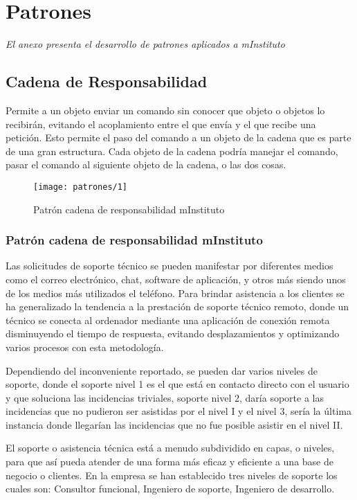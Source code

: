 \chapter{Patrones}
\label{apex:patrones}
\textit{El anexo presenta el desarrollo de patrones aplicados a mInstituto}
\vfill
\minitoc
\cleardoublepage

\section{Cadena de Responsabilidad}
Permite a un objeto enviar un comando sin conocer que objeto o objetos lo recibirán, evitando el acoplamiento entre el que envía y el que recibe una petición. Esto permite el paso del comando a un objeto de la cadena que es parte de una gran estructura. Cada objeto de la cadena podría manejar el comando, pasar el comando al siguiente objeto de la cadena, o las dos cosas. \cite{ref12}

  \begin{figure}[H]
 	\centering
  	\texttt{[image: patrones/1]}
  	\captionsetup{width=.95\textwidth}
  	\caption{Patrón cadena de responsabilidad mInstituto \cite{ref9,ref6}}
  	\label{patron1}
  \end{figure}

  \subsection{Patrón cadena de responsabilidad mInstituto}
  Las solicitudes de soporte técnico se pueden manifestar por diferentes medios como el correo electrónico, chat, software de aplicación, y otros más siendo unos de los medios más utilizados el teléfono. Para brindar asistencia a los clientes se ha generalizado la tendencia a la prestación de soporte técnico remoto, donde un técnico se conecta al ordenador mediante una aplicación de conexión remota disminuyendo el tiempo de respuesta, evitando desplazamientos y optimizando varios procesos con esta metodología.
  
  Dependiendo del inconveniente reportado, se pueden dar varios niveles de soporte, donde el soporte nivel 1 es el que está en contacto directo con el usuario y que soluciona las incidencias triviales, soporte nivel 2, daría soporte a las incidencias que no pudieron ser asistidas por el nivel I y el nivel 3, sería la última instancia donde llegarían las incidencias que no fue posible asistir en el nivel II.
  
  El soporte o asistencia técnica está a menudo subdividido en capas, o niveles, para que así pueda atender de una forma más eficaz y eficiente a una base de negocio o clientes. En la empresa se han establecido tres niveles de soporte los cuales son: Consultor funcional, Ingeniero de soporte, Ingeniero de desarrollo.

